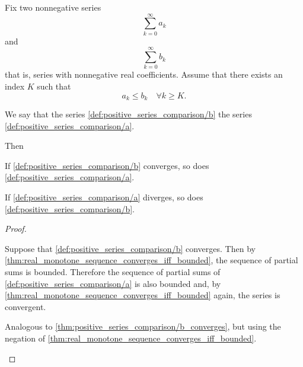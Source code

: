 \begin{proposition}\label{thm:positive_series_comparison}\cite[]{Фихтенгольц1968/2}
  Fix two nonnegative series
  \begin{equation}\label{def:positive_series_comparison/a}
    \sum_{k=0}^\infty a_k
  \end{equation}
  and
  \begin{equation}\label{def:positive_series_comparison/b}
    \sum_{k=0}^\infty b_k
  \end{equation}
  that is, series with nonnegative real coefficients. Assume that there exists an index \( K \) such that
  \begin{equation*}
    a_k \leq b_k \quad\forall k \geq K.
  \end{equation*}

  We say that the series \cref{def:positive_series_comparison/b}  the series \cref{def:positive_series_comparison/a}.

  Then
  \begin{propenum}
     If \cref{def:positive_series_comparison/b} converges, so does \cref{def:positive_series_comparison/a}.

     If \cref{def:positive_series_comparison/a} diverges, so does \cref{def:positive_series_comparison/b}.
  \end{propenum}
\end{proposition}
\begin{proof}
  \begin{description}
     Suppose that \cref{def:positive_series_comparison/b} converges. Then by \cref{thm:real_monotone_sequence_converges_iff_bounded}, the sequence of partial sums is bounded. Therefore the sequence of partial sums of \cref{def:positive_series_comparison/a} is also bounded and, by \cref{thm:real_monotone_sequence_converges_iff_bounded} again, the series is convergent.

     Analogous to \cref{thm:positive_series_comparison/b_converges}, but using the negation of \cref{thm:real_monotone_sequence_converges_iff_bounded}.
  \end{description}
\end{proof}

